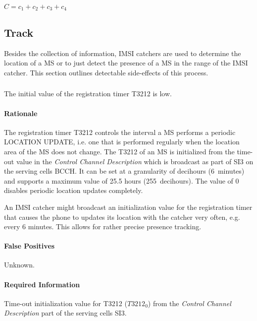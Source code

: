 \documentclass[a4paper,11pt,notitlepage,bigheadings,oneside]{scrartcl}
\begin{document}
$C = c_1 + c_2 + c_3 + c_4$

\subsection{Track}

Besides the collection of information, IMSI catchers are used to determine the
location of a MS or to just detect the presence of a MS in the range of the
IMSI catcher. This section outlines detectable side-effects of this process.

\subsubsection{}

The initial value of the registration timer T3212 is low.

\paragraph{Rationale}

The registration timer T3212 controls the interval a MS performs a periodic
LOCATION UPDATE, i.e. one that is performed regularly when the location area of
the MS does not change. The T3212 of an MS is initialized from the time-out
value in the \emph{Control Channel Description} which is broadcast as part of
SI3 on the serving cells BCCH. It can be set at a granularity of decihours
(6~minutes) and supports a maximum value of 25.5 hours (255~decihours). The
value of 0 disables periodic location updates completely.

An IMSI catcher might broadcast an initialization value for the registration
timer that causes the phone to updates its location with the catcher very
often, e.g. every 6 minutes. This allows for rather precise presence tracking.

\paragraph{False Positives}

Unknown.

\paragraph{Required Information}

Time-out initialization value for T3212 ($T3212_0$) from the \emph{Control
Channel Description} part of the serving cells SI3.
\end{document}

